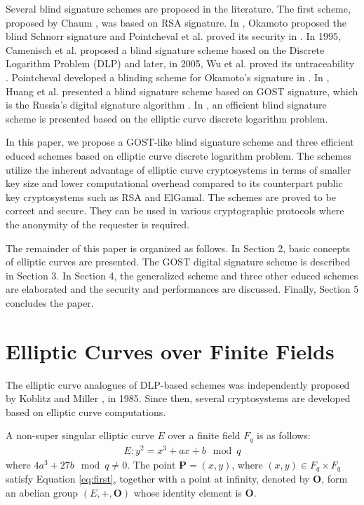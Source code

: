 \documentclass[journal,onecolumn,draftcls]{IEEEtran}
\begin{document}
Several blind signature schemes are proposed in the literature. The first scheme, proposed by Chaum \cite{Chaum82}, was based on RSA signature. In \cite{Okamoto}, Okamoto proposed the blind Schnorr signature and Pointcheval et al. proved its security in \cite{Pointcheval}. In 1995, Camenisch et al. proposed a blind signature scheme based on the Discrete Logarithm Problem (DLP) \cite{Camenisch} and later, in 2005, Wu et al. proved its untraceability \cite{Ting}. Pointcheval developed a blinding scheme for Okamoto's signature in \cite{Pointcheval2}. In \cite{Huang}, Huang et al. presented a blind signature scheme based on GOST signature, which is the Russia's digital signature algorithm \cite{Michels}. In \cite{Nikooghadam}, an efficient blind signature scheme is presented based on the elliptic curve discrete logarithm problem.

In this paper, we propose a GOST-like blind signature scheme and three efficient educed schemes based on elliptic curve discrete logarithm problem. The schemes utilize the inherent advantage of elliptic curve cryptosystems in terms of smaller key size and lower computational overhead compared to its counterpart public key cryptosystems such as RSA and ElGamal. The schemes are proved to be correct and secure. They can be used in various cryptographic protocols where the anonymity of the requester is required.

The remainder of this paper is organized as follows. In Section 2, basic concepts of elliptic curves are presented. The GOST digital signature scheme is described in Section 3. In Section 4, the generalized scheme and three other educed schemes are elaborated and the security and performances are discussed. Finally, Section 5 concludes the paper.

\section{Elliptic Curves over Finite Fields}
The elliptic curve analogues of DLP-based schemes was independently proposed by Koblitz \cite{Koblitz} and Miller \cite{Miller}, in 1985. Since then, several cryptosystems are developed based on elliptic curve computations.

A non-super singular elliptic curve $E$ over a finite field $F_q$ is as follows:
\begin{align}
E: y^2=x^3+ax+b \mod q
\label{eq:first}
\end{align}
where $4a^3+27b \mod q\not=0$. The point $\textbf{P}=(x,y)$, where $(x,y)\in F_q\times F_q$ satisfy Equation \ref{eq:first}, together with a point at infinity, denoted by $\textbf{O}$, form an abelian group $(E,+,\textbf{O})$ whose identity element is $\textbf{O}$. 
\end{document}
